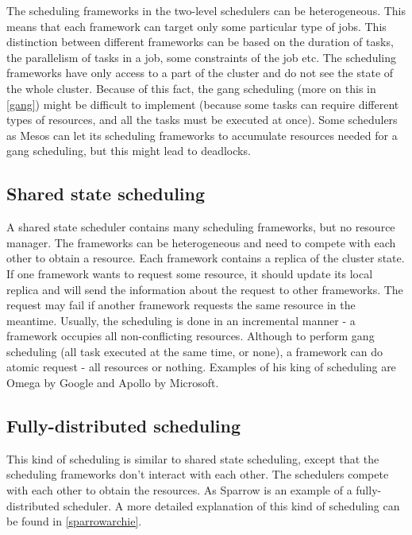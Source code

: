 \documentclass[11pt]{article}
\begin{document}
        The scheduling frameworks in the two-level schedulers can be heterogeneous. This means that each framework can target only some particular type of jobs. This distinction between different frameworks can be based on the duration of tasks, the parallelism of tasks in a job, some constraints of the job etc. The scheduling frameworks have only access to a part of the cluster and do not see the state of the whole cluster. Because of this fact, the gang scheduling (more on this in \ref{gang}) might be difficult to implement (because some tasks can require different types of resources, and all the tasks must be executed at once). Some schedulers as Mesos \cite{mesos} can let its scheduling frameworks to accumulate resources needed for a gang scheduling, but this might lead to deadlocks.
    
    \subsection{Shared state scheduling}

		A shared state scheduler contains many scheduling frameworks, but no resource manager. The frameworks can be heterogeneous and need to compete with each other to obtain a resource. Each framework contains a replica of the cluster state. If one framework wants to request some resource, it should update its local replica and will send the information about the request to other frameworks. The request may fail if another framework requests the same resource in the meantime. Usually, the scheduling is done in an incremental manner - a framework occupies all non-conflicting resources. Although to perform gang scheduling (all task executed at the same time, or none), a framework can do atomic request - all resources or nothing. Examples of his king of scheduling are Omega \cite{omega} by Google and Apollo \cite{apollo} by Microsoft.
    
    \subsection{Fully-distributed scheduling}
    	This kind of scheduling is similar to shared state scheduling, except that the scheduling frameworks don't interact with each other. The schedulers compete with each other to obtain the resources. As Sparrow is an example of a fully-distributed scheduler. A more detailed explanation of this kind of scheduling can be found in \ref{sparrowarchie}.%
        
\end{document}
